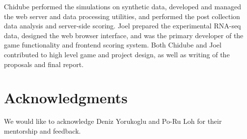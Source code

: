 \documentclass[12pt]{article}
\begin{document}
Chidube performed the simulations on synthetic data, developed and managed the web server and data processing utilities, and performed the post collection data analysis and server-side scoring. Joel prepared the experimental RNA-seq data, designed the web browser interface, and was the primary developer of the game functionality and frontend scoring system. Both Chidube and Joel contributed to high level game and project design, as well as writing of the proposals and final report.

\section*{Acknowledgments}
We would like to acknowledge Deniz Yorukoglu and Po-Ru Loh for their mentorship and feedback.


\end{document}
